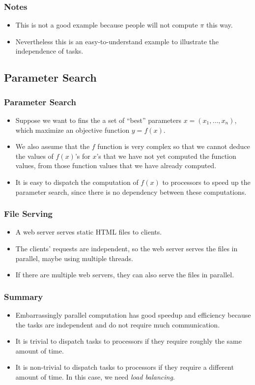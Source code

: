 \documentclass{beamer}
\begin{document}
\begin{CJK}{UTF8}{bsmi}
\begin{frame}
\frametitle{Notes}
\begin{itemize}
\item This is not a good example because people will not compute $\pi$ this way.
\item Nevertheless this is an easy-to-understand example to illustrate the independence of tasks.
\end{itemize}
\end{frame}

\subsection{Parameter Search}

\begin{frame}
\frametitle{Parameter Search}
\begin{itemize}
\item Suppose we want to fins the a set of ``best'' parameters $x = (x_1, \ldots, x_n)$, which maximize an objective function $y = f(x)$.
\item We also assume that the $f$ function is very complex so that we cannot deduce the values of $f(x)$'s for $x$'s that we have not yet computed the function values, from those function values that we have already computed.
\item It is easy to dispatch the computation of $f(x)$ to processors to speed up the parameter search, since there is no dependency between these computations.
\end{itemize}
\end{frame}

\begin{frame}
\frametitle{File Serving}
\begin{itemize}
\item A web server serves static HTML files to clients.
\item The clients' requests are independent, so the web server serves the files in parallel, maybe using multiple threads.
\item If there are multiple web servers, they can also serve the files in parallel.
\end{itemize}
\end{frame}

\begin{frame}
\frametitle{Summary}
\begin{itemize}
\item Embarrassingly parallel computation has good speedup and efficiency because the tasks are independent and do not require much communication.
\item It is trivial to dispatch tasks to processors if they require roughly the same amount of time.
\item It is non-trivial to dispatch tasks to processors if they require a different amount of time.  
In this case, we need {\em load balancing}.
\end{itemize}
\end{frame}



\end{CJK}
\end{document}

